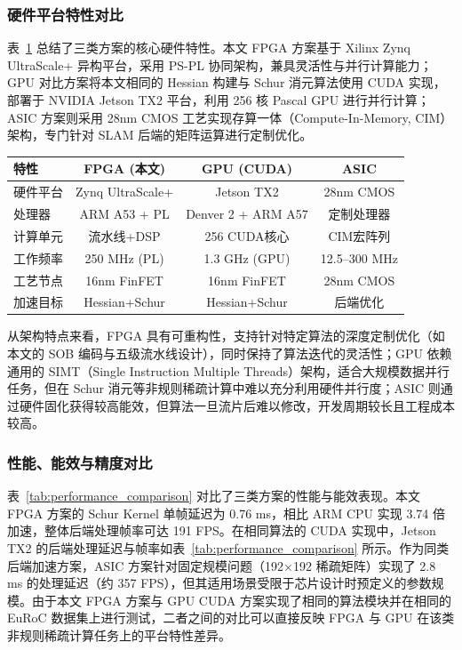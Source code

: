 \subsubsection{硬件平台特性对比}

表~\ref{tab:platform_comparison} 总结了三类方案的核心硬件特性。本文 FPGA 方案基于 Xilinx Zynq UltraScale+ 异构平台，采用 PS-PL 协同架构，兼具灵活性与并行计算能力；GPU 对比方案将本文相同的 Hessian 构建与 Schur 消元算法使用 CUDA 实现，部署于 NVIDIA Jetson TX2 平台，利用 256 核 Pascal GPU 进行并行计算；ASIC 方案\cite{Li2024SLAMCIM}则采用 28nm CMOS 工艺实现存算一体（Compute-In-Memory, CIM）架构，专门针对 SLAM 后端的矩阵运算进行定制优化。

\begin{table}[h!t]
\centering
{}
\label{tab:platform_comparison}
\scriptsize
\begin{tabular*}{\textwidth}{@{\extracolsep{\fill}}lccc}
\toprule
特性 & FPGA (本文) & GPU (CUDA) & ASIC\cite{Li2024SLAMCIM} \\
\midrule
硬件平台 & Zynq UltraScale+ & Jetson TX2 & 28nm CMOS \\
处理器 & ARM A53 + PL & Denver 2 + ARM A57 & 定制处理器 \\
计算单元 & 流水线+DSP & 256 CUDA核心 & CIM宏阵列 \\
工作频率 & 250 MHz (PL) & 1.3 GHz (GPU) & 12.5--300 MHz \\
工艺节点 & 16nm FinFET & 16nm FinFET & 28nm CMOS \\
加速目标 & Hessian+Schur & Hessian+Schur & 后端优化 \\
\bottomrule
\end{tabular*}
\end{table}

从架构特点来看，FPGA 具有可重构性，支持针对特定算法的深度定制优化（如本文的 SOB 编码与五级流水线设计），同时保持了算法迭代的灵活性；GPU 依赖通用的 SIMT（Single Instruction Multiple Threads）架构，适合大规模数据并行任务，但在 Schur 消元等非规则稀疏计算中难以充分利用硬件并行度；ASIC 则通过硬件固化获得较高能效，但算法一旦流片后难以修改，开发周期较长且工程成本较高。

\subsubsection{性能、能效与精度对比}

表~\ref{tab:performance_comparison} 对比了三类方案的性能与能效表现。本文 FPGA 方案的 Schur Kernel 单帧延迟为 0.76 ms，相比 ARM CPU 实现 3.74 倍加速，整体后端处理帧率可达 191 FPS。在相同算法的 CUDA 实现中，Jetson TX2 的后端处理延迟与帧率如表~\ref{tab:performance_comparison} 所示。作为同类后端加速方案，ASIC 方案\cite{Li2024SLAMCIM}针对固定规模问题（192$\times$192 稀疏矩阵）实现了 2.8 ms 的处理延迟（约 357 FPS），但其适用场景受限于芯片设计时预定义的参数规模。由于本文 FPGA 方案与 GPU CUDA 方案实现了相同的算法模块并在相同的 EuRoC 数据集上进行测试，二者之间的对比可以直接反映 FPGA 与 GPU 在该类非规则稀疏计算任务上的平台特性差异。

